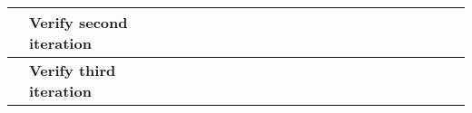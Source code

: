 \begin{table}[ht!]
\begin{tabular}{lp{2.5in}|llllllllllllllllllll|}
    \multicolumn{1}{|l|}{\cellcolor[HTML]{00E2FF}\textbf{}}                & \cellcolor[HTML]{00E2FF}\textbf{Verify second iteration}                   & \multicolumn{1}{l|}{}                                   & \multicolumn{1}{l|}{}                                   & \multicolumn{1}{l|}{}                                   & \multicolumn{1}{l|}{}                                   & \multicolumn{1}{l|}{}                                   & \multicolumn{1}{l|}{}                                   & \multicolumn{1}{l|}{}                                   & \multicolumn{1}{l|}{}                                   & \multicolumn{1}{l|}{}                                   & \multicolumn{1}{l|}{}                                    & \multicolumn{1}{l|}{}                                    & \multicolumn{1}{l|}{}                                    & \multicolumn{1}{l|}{\cellcolor[HTML]{F8A102}}            & \multicolumn{1}{l|}{}                                    & \multicolumn{1}{l|}{}                                    & \multicolumn{1}{l|}{}                                    & \multicolumn{1}{l|}{}                                    & \multicolumn{1}{l|}{}                                    & \multicolumn{1}{l|}{}                                    &             \\ \hline
    \multicolumn{1}{|l|}{\cellcolor[HTML]{00E2FF}\textbf{}}                & \cellcolor[HTML]{00E2FF}\textbf{Verify third iteration}                    & \multicolumn{1}{l|}{}                                   & \multicolumn{1}{l|}{}                                   & \multicolumn{1}{l|}{}                                   & \multicolumn{1}{l|}{}                                   & \multicolumn{1}{l|}{}                                   & \multicolumn{1}{l|}{}                                   & \multicolumn{1}{l|}{}                                   & \multicolumn{1}{l|}{}                                   & \multicolumn{1}{l|}{}                                   & \multicolumn{1}{l|}{}                                    & \multicolumn{1}{l|}{}                                    & \multicolumn{1}{l|}{}                                    & \multicolumn{1}{l|}{}                                    & \multicolumn{1}{l|}{\cellcolor[HTML]{F8A102}}            & \multicolumn{1}{l|}{}                                    & \multicolumn{1}{l|}{}                                    & \multicolumn{1}{l|}{}                                    & \multicolumn{1}{l|}{}                                    & \multicolumn{1}{l|}{}                                    &             \\ \hline

\end{tabular}
\end{table}
